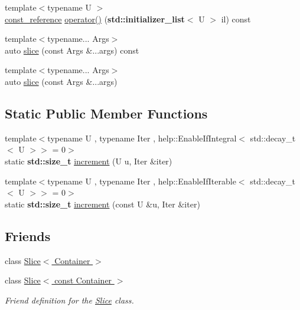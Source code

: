 {\bf }\par
\begin{DoxyCompactItemize}
\item 
{\footnotesize template$<$typename U $>$ }\\\hyperlink{classcnt_1_1help_1_1Container_a388ebfcebe3759453a569af7d57267b5}{const\+\_\+reference} \hyperlink{classcnt_1_1help_1_1Container_a4917f3fa40a032a993114b423b6f6676}{operator()} ({\bf std\+::initializer\+\_\+list}$<$ U $>$ il) const 
\end{DoxyCompactItemize}

{\bf }\par
\begin{DoxyCompactItemize}
\item 
{\footnotesize template$<$typename... Args$>$ }\\auto \hyperlink{classcnt_1_1help_1_1Container_a800ac21ca3d9d89becb0a532cf3c5c08}{slice} (const Args \&...args) const 
\item 
{\footnotesize template$<$typename... Args$>$ }\\auto \hyperlink{classcnt_1_1help_1_1Container_aa465cba47315d064aeae1048e6547445}{slice} (const Args \&...args)
\end{DoxyCompactItemize}

\subsection*{Static Public Member Functions}
\begin{DoxyCompactItemize}
\item 
{\footnotesize template$<$typename U , typename Iter , help\+::\+Enable\+If\+Integral$<$ std\+::decay\+\_\+t$<$ U $>$$>$  = 0$>$ }\\static {\bf std\+::size\+\_\+t} \hyperlink{classcnt_1_1help_1_1Container_a4a4953ce456208660cdbc8dfbc8eb50e}{increment} (U u, Iter \&iter)
\item 
{\footnotesize template$<$typename U , typename Iter , help\+::\+Enable\+If\+Iterable$<$ std\+::decay\+\_\+t$<$ U $>$$>$  = 0$>$ }\\static {\bf std\+::size\+\_\+t} \hyperlink{classcnt_1_1help_1_1Container_a7fe8455c16cc35c3f30c00151f332dfc}{increment} (const U \&u, Iter \&iter)
\end{DoxyCompactItemize}
\subsection*{Friends}
\begin{DoxyCompactItemize}
\item 
class \hyperlink{classcnt_1_1help_1_1Container_aebd52b76fc246e48b629887d4025eda6}{Slice$<$ Container $>$}
\item 
class \hyperlink{classcnt_1_1help_1_1Container_aa082f0b2bccdce6fc9fc7339bf98a2b1}{Slice$<$ const Container $>$}
\begin{DoxyCompactList}\small\item\em Friend definition for the \textquotesingle{}\hyperlink{classcnt_1_1help_1_1Slice}{Slice}\textquotesingle{} class. \end{DoxyCompactList}\end{DoxyCompactItemize}
